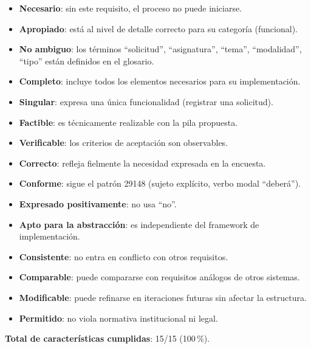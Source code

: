 \documentclass[11pt,a4paper]{article}
\begin{document}
\begin{itemize}[leftmargin=*]
    \item \textbf{Necesario}: sin este requisito, el proceso no puede iniciarse.
    \item \textbf{Apropiado}: est\'a al nivel de detalle correcto para su categor\'ia (funcional).
    \item \textbf{No ambiguo}: los t\'erminos ``solicitud'', ``asignatura'', ``tema'', ``modalidad'', ``tipo'' est\'an definidos en el glosario.
    \item \textbf{Completo}: incluye todos los elementos necesarios para su implementaci\'on.
    \item \textbf{Singular}: expresa una \'unica funcionalidad (registrar una solicitud).
    \item \textbf{Factible}: es t\'ecnicamente realizable con la pila propuesta.
    \item \textbf{Verificable}: los criterios de aceptaci\'on son observables.
    \item \textbf{Correcto}: refleja fielmente la necesidad expresada en la encuesta.
    \item \textbf{Conforme}: sigue el patr\'on 29148 (sujeto expl\'icito, verbo modal ``deber\'a'').
    \item \textbf{Expresado positivamente}: no usa ``no''.
    \item \textbf{Apto para la abstracci\'on}: es independiente del framework de implementaci\'on.
    \item \textbf{Consistente}: no entra en conflicto con otros requisitos.
    \item \textbf{Comparable}: puede compararse con requisitos an\'alogos de otros sistemas.
    \item \textbf{Modificable}: puede refinarse en iteraciones futuras sin afectar la estructura.
    \item \textbf{Permitido}: no viola normativa institucional ni legal.
\end{itemize}

\textbf{Total de caracter\'isticas cumplidas}: 15/15 (100\,\%).
\end{document}
